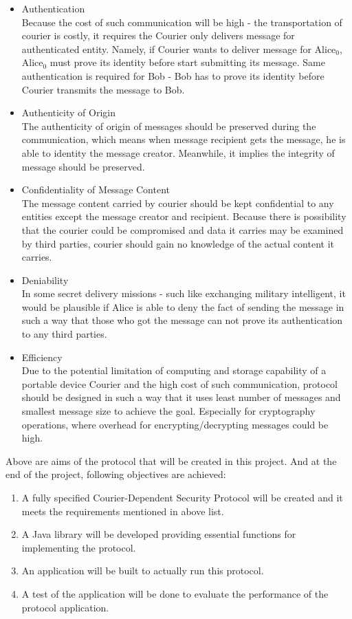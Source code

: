 \begin{itemize}
\item Authentication \\
Because the cost of such communication will be high - the transportation of courier is costly, it requires the Courier only delivers message for authenticated entity. Namely, if Courier wants to deliver message for Alice$_0$, Alice$_0$ must prove its identity before start submitting its message. Same authentication is required for Bob - Bob has to prove its identity before Courier transmits the message to Bob.

\item Authenticity of Origin \\
The authenticity of origin of messages should be preserved during the communication, which means when message recipient gets the message, he is able to identity the message creator. Meanwhile, it implies the integrity of message should be preserved.

\item Confidentiality of Message Content \\
The message content carried by courier should be kept confidential to any entities except the message creator and recipient. Because there is possibility that the courier could be compromised and data it carries may be examined by third parties, courier should gain no knowledge of the actual content it carries.

\item Deniability \\
In some secret delivery missions - such like exchanging military intelligent, it would be plausible if Alice is able to deny the fact of sending the message in such a way that those who got the message can not prove its authentication to any third parties.

\item Efficiency \\
Due to the potential limitation of computing and storage capability of a portable device Courier and the high cost of such communication, protocol should be designed in such a way that it uses least number of messages and smallest message size to achieve the goal. Especially for cryptography operations, where overhead for encrypting/decrypting messages could be high.
\end{itemize}

\noindent
Above are aims of the protocol that will be created in this project. And at the end of the project, following objectives are achieved:
\begin{enumerate}
\item A fully specified Courier-Dependent Security Protocol will be created and it meets the requirements mentioned in above list.
\item A Java library will be developed providing essential functions for implementing the protocol.
\item An application will be built to actually run this protocol.
\item A test of the application will be done to evaluate the performance of the protocol application.
\end{enumerate}

